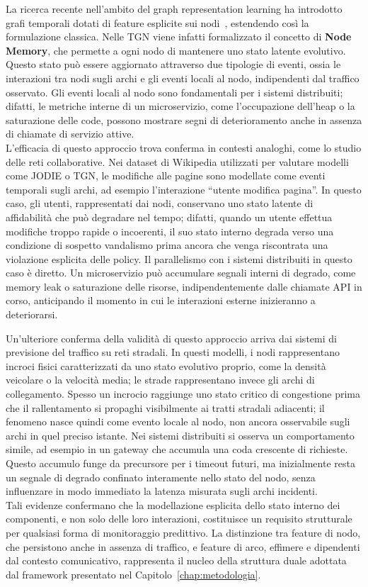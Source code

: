 La ricerca recente nell'ambito del graph representation learning ha introdotto grafi temporali 
dotati di feature esplicite sui nodi~\cite{rossi2020}, estendendo così la formulazione classica. 
Nelle \gls{TGN} viene infatti formalizzato il concetto di \textbf{Node Memory}, che permette a ogni nodo di 
mantenere uno stato latente evolutivo. Questo stato può essere aggiornato attraverso 
due tipologie di eventi, ossia le interazioni tra nodi sugli archi e gli eventi locali al nodo, 
indipendenti dal traffico osservato. Gli eventi locali al nodo sono fondamentali per i sistemi distribuiti; 
difatti, le metriche interne di un microservizio, come l'occupazione dell'heap o la saturazione delle code, 
possono mostrare segni di deterioramento anche in assenza di chiamate di servizio attive. \\
L'efficacia di questo approccio trova conferma in contesti analoghi, come lo studio delle reti collaborative. 
Nei dataset di Wikipedia utilizzati per valutare modelli come JODIE o \gls{TGN}, le modifiche alle 
pagine sono modellate come eventi temporali sugli archi, ad esempio l'interazione ``utente modifica pagina''. 
In questo caso, gli utenti, rappresentati dai nodi, conservano uno stato latente di affidabilità 
che può degradare nel tempo; difatti, quando un utente effettua modifiche troppo rapide o incoerenti, 
il suo stato interno degrada verso una condizione di sospetto vandalismo prima ancora che venga 
riscontrata una violazione esplicita delle policy. Il parallelismo con i sistemi distribuiti in questo caso è diretto. 
Un microservizio può accumulare segnali interni di degrado, come memory leak o saturazione delle risorse, 
indipendentemente dalle chiamate \gls{API} in corso, anticipando il momento in cui le interazioni esterne inizieranno a deteriorarsi.

Un'ulteriore conferma della validità di questo approccio arriva dai sistemi di previsione del 
traffico su reti stradali. In questi modelli, i nodi rappresentano incroci fisici caratterizzati 
da uno stato evolutivo proprio, come la densità veicolare o la velocità media; 
le strade rappresentano invece gli archi di collegamento. Spesso un incrocio raggiunge uno stato critico di congestione
prima che il rallentamento si propaghi visibilmente ai tratti stradali adiacenti; il fenomeno
nasce quindi come evento locale al nodo, non ancora osservabile sugli archi in quel preciso
istante. Nei sistemi distribuiti si osserva un comportamento simile, ad esempio in un gateway
che accumula una coda crescente di richieste. Questo accumulo funge da precursore per i timeout
futuri, ma inizialmente resta un segnale di degrado confinato interamente nello stato del nodo,
senza influenzare in modo immediato la latenza misurata sugli archi incidenti. \\
Tali evidenze confermano che la modellazione esplicita dello stato interno dei componenti, e
non solo delle loro interazioni, costituisce un requisito strutturale per qualsiasi forma di
monitoraggio predittivo. La distinzione tra feature di nodo, che persistono anche in assenza
di traffico, e feature di arco, effimere e dipendenti dal contesto comunicativo, rappresenta
il nucleo della struttura duale adottata dal framework presentato nel Capitolo~\ref{chap:metodologia}. 

